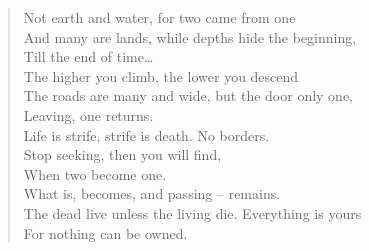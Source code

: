 

\begin{verse}
Not earth and water, for two came from one\\
And many are lands, while depths hide the beginning,\\
Till the end of time\ldots\\[2ex]

The higher you climb, the lower you descend\\
The roads are many and wide, but the door only one,\\
Leaving, one returns.\\[2ex]

Life is strife, strife is death. No borders. \\
Stop seeking, then you will find, \\
When two become one.\\[2ex]

What is, becomes, and passing -- remains.\\
The dead live unless the living die. 
Everything is yours\\
For nothing can be owned.
\end{verse}



%

